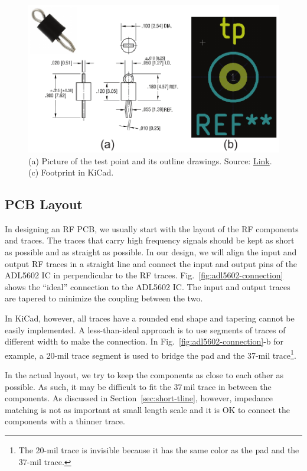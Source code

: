 \documentclass[12pt,letterpaper]{scrartcl}
\begin{document}
	\begin{figure}[ph]
		\centering
		\includegraphics[width=4.5in]{testpoint-footprint}
		\caption{(a) Picture of the test point and its outline drawings. Source: \href{http://www.digikey.com/product-detail/en/5001/5001K-ND/255327}{Link}. (c) Footprint in KiCad.}
		\label{fig:testpoint-footprint}
	\end{figure}
	
\subsection{PCB Layout}

In designing an RF PCB, we usually start with the layout of the RF components and traces. The traces that carry high frequency signals should be kept as short as possible and as straight as possible. In our design, we will align the input and output RF traces in a straight line and connect the input and output pins of the ADL5602 IC in perpendicular to the RF traces. Fig.~\ref{fig:adl5602-connection} shows the ``ideal'' connection to the ADL5602 IC. The input and output traces are tapered to minimize the coupling between the two. 

In KiCad, however, all traces have a rounded end shape and tapering cannot be easily implemented. A less-than-ideal approach is to use segments of traces of different width to make the connection. In Fig.~\ref{fig:adl5602-connection}-b for example, a 20-mil trace segment is used to bridge the pad and the 37-mil trace\footnote{The 20-mil trace is invisible because it has the same color as the pad and the 37-mil trace.}. 

In the actual layout, we try to keep the components as close to each other as possible. As such, it may be difficult to fit the 37\,mil trace in between the components. As discussed in Section~\ref{sec:short-tline}, however, impedance matching is not as important at small length scale and it is OK to connect the components with a thinner trace.
\end{document}
